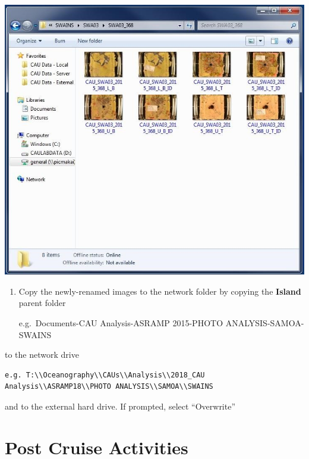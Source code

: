 \documentclass[]{book}
\begin{document}
\includegraphics{images/Camera18.jpg}

\begin{enumerate}
\def\labelenumi{\arabic{enumi}.}
\setcounter{enumi}{20}
\item
  Copy the newly-renamed images to the network folder by copying the \textbf{Island} parent folder

  e.g.~Documents-CAU Analysis-ASRAMP 2015-PHOTO ANALYSIS-SAMOA-SWAINS
\end{enumerate}

to the network drive

\begin{verbatim}
e.g. T:\\Oceanography\\CAUs\\Analysis\\2018_CAU Analysis\\ASRAMP18\\PHOTO ANALYSIS\\SAMOA\\SWAINS  
\end{verbatim}

and to the external hard drive. If prompted, select ``Overwrite''

\hypertarget{postcruise}{%
\chapter{Post Cruise Activities}\label{postcruise}}
\end{document}
